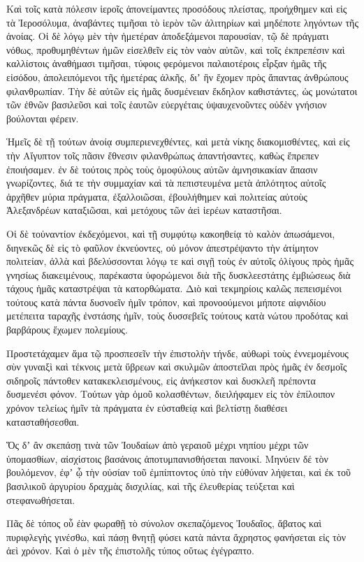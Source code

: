 {\par }{\PP {}Καὶ τοῖς κατὰ πόλεσιν ἱεροῖς ἀπονείμαντες προσόδους πλείστας, προήχθημεν καὶ εἰς τὰ Ἰεροσόλυμα, ἀναβάντες τιμῆσαι τὸ ἱερὸν τῶν ἀλιτηρίων καὶ μηδέποτε ληγόντων τῆς ἀνοίας.
Οἱ δὲ λόγῳ μὲν τὴν ἡμετέραν ἀποδεξάμενοι παρουσίαν, τῷ δὲ πράγματι νόθως, προθυμηθέντων ἡμῶν εἰσελθεῖν εἰς τὸν ναὸν αὐτῶν, καὶ τοῖς ἐκπρεπέσιν καὶ καλλίστοις ἀναθήμασι τιμῆσαι,
τύφοις φερόμενοι παλαιοτέροις εἶρξαν ἡμᾶς τῆς εἰσόδου, ἀπολειπόμενοι τῆς ἡμετέρας ἀλκῆς, διʼ ἣν ἔχομεν πρὸς ἅπαντας ἀνθρώπους φιλανθρωπίαν.
Τὴν δὲ αὐτῶν εἰς ἡμᾶς δυσμένειαν ἔκδηλον καθιστάντες, ὡς μονώτατοι τῶν ἐθνῶν βασιλεῦσι καὶ τοῖς ἑαυτῶν εὐεργέταις ὑψαυχενοῦντες οὐδὲν γνήσιον βούλονται φέρειν.
\par }{\PP {}Ἡμεῖς δὲ τῇ τούτων ἀνοίᾳ συμπεριενεχθέντες, καὶ μετὰ νίκης διακομισθέντες, καὶ εἰς τὴν Αἴγυπτον τοῖς πᾶσιν ἔθνεσιν φιλανθρώπως ἀπαντήσαντες, καθὼς ἔπρεπεν ἐποιήσαμεν.
ἐν δὲ τούτοις πρὸς τοὺς ὁμοφύλους αὐτῶν ἀμνησικακίαν ἅπασιν γνωρίζοντες, διά τε τὴν συμμαχίαν καὶ τὰ πεπιστευμένα μετὰ ἁπλότητος αὐτοῖς ἀρχῆθεν μύρια πράγματα, ἐξαλλοιῶσαι, ἐβουλήθημεν καὶ πολιτείας αὐτοὺς Ἀλεξανδρέων καταξιῶσαι, καὶ μετόχους τῶν ἀεὶ ἱερέων καταστῆσαι.
\par }{\PP {}Οἱ δὲ τοὐναντίον ἐκδεχόμενοι, καὶ τῇ συμφύτῳ κακοηθείᾳ τὸ καλὸν ἀπωσάμενοι, διηνεκῶς δὲ εἰς τὸ φαῦλον ἐκνεύοντες,
οὐ μόνον ἀπεστρέψαντο τὴν ἀτίμητον πολιτείαν, ἀλλὰ καὶ βδελύσσονται λόγῳ τε καὶ σιγῇ τοὺς ἐν αὐτοῖς ὀλίγους πρὸς ἡμᾶς γνησίως διακειμένους, παρέκαστα ὑφορώμενοι διὰ τῆς δυσκλεεστάτης ἐμβιώσεως διὰ τάχους ἡμᾶς καταστρέψαι τὰ κατορθώματα.
Διὸ καὶ τεκμηρίοις καλῶς πεπεισμένοι τούτους κατὰ πάντα δυσνοεῖν ἡμῖν τρόπον, καὶ προνοούμενοι μήποτε αἰφνιδίου μετέπειτα ταραχῆς ἐνστάσης ἡμῖν, τοὺς δυσσεβεῖς τούτους κατὰ νώτου προδότας καὶ βαρβάρους ἔχωμεν πολεμίους.
\par }{\PP {}Προστετάχαμεν ἅμα τῷ προσπεσεῖν τὴν ἐπιστολὴν τήνδε, αὐθωρὶ τοὺς ἐννεμομένους σὺν γυναιξὶ καὶ τέκνοις μετὰ ὕβρεων καὶ σκυλμῶν ἀποστεῖλαι πρὸς ἡμᾶς ἐν δεσμοῖς σιδηροῖς πάντοθεν κατακεκλεισμένους, εἰς ἀνήκεστον καὶ δυσκλεῆ πρέποντα δυσμενέσι φόνον.
Τούτων γὰρ ὁμοῦ κολασθέντων, διειλήφαμεν εἰς τὸν ἐπίλοιπον χρόνον τελείως ἡμῖν τὰ πράγματα ἐν εὐσταθείᾳ καὶ βελτίστῃ διαθέσει κατασταθήσεσθαι.
\par }{\PP {}Ὅς δʼ ἂν σκεπάσῃ τινὰ τῶν Ἰουδαίων ἀπὸ γεραιοῦ μέχρι νηπίου μέχρι τῶν ὑπομασθίων, αἰσχίστοις βασάνοις ἀποτυμπανισθήσεται πανοικί.
Μηνύειν δέ τὸν βουλόμενον, ἐφʼ ᾧ τὴν οὐσίαν τοῦ ἐμπίπτοντος ὑπὸ τὴν εὐθύναν λήψεται, καὶ ἐκ τοῦ βασιλικοῦ ἀργυρίου δραχμὰς δισχιλίας, καὶ τῆς ἐλευθερίας τεύξεται καὶ στεφανωθήσεται.
\par }{\PP {}Πᾶς δὲ τόπος οὗ ἐὰν φωραθῇ τὸ σύνολον σκεπαζόμενος Ἰουδαῖος, ἄβατος καὶ πυριφλεγὴς γινέσθω, καὶ πάσῃ θνητῇ φύσει κατὰ πάντα ἄχρηστος φανήσεται εἰς τὸν ἀεὶ χρόνον.
Καὶ ὁ μὲν τῆς ἐπιστολῆς τύπος οὕτως ἐγέγραπτο.

}
